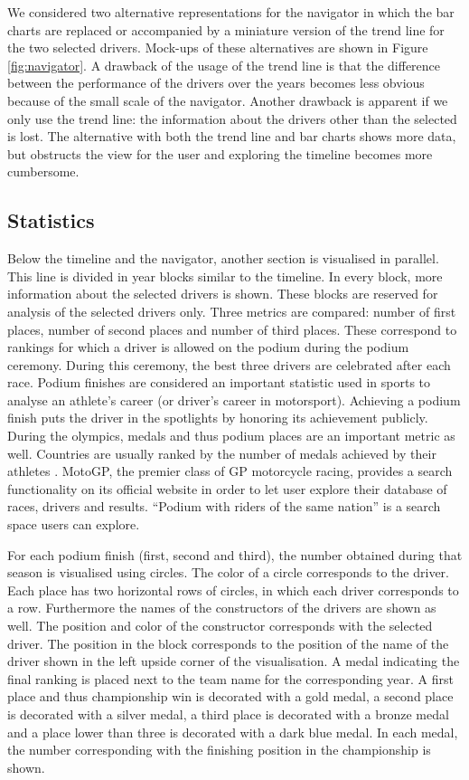 \documentclass{sigchi}
\begin{document}
We considered two alternative representations for the navigator in which the bar charts are replaced or accompanied by a miniature version of the trend line for the two selected drivers. Mock-ups of these alternatives are shown in Figure \ref{fig:navigator}. A drawback of the usage of the trend line is that the difference between the performance of the drivers over the years becomes less obvious because of the small scale of the navigator. Another drawback is apparent if we only use the trend line: the information about the drivers other than the selected is lost.
The alternative with both the trend line and bar charts shows more data, but obstructs the view for the user and exploring the timeline becomes more cumbersome.


\subsection{Statistics}

\label{statistics}
Below the timeline and the navigator, another section is visualised in parallel. This line is divided in year blocks similar to the timeline. In every block, more information about the selected  drivers is shown. These blocks are reserved for analysis of the selected drivers only. Three metrics are compared: number of first places, number of second places and number of third places. These correspond to rankings for which a driver is allowed on the podium during the podium ceremony. During this ceremony, the best three drivers are celebrated after each race. Podium finishes are considered an important statistic used in sports to analyse an athlete's career (or driver's career in motorsport). Achieving a podium finish puts the driver in the spotlights by honoring its achievement publicly. During the olympics, medals and thus podium places are an important metric as well. Countries are usually ranked by the number of medals achieved by their athletes \cite{olympic}. MotoGP, the premier class of GP motorcycle racing\cite{motogp}, provides a search functionality on its official website in order to let user explore their database of races, drivers and results. ``Podium with riders of the same nation'' is a search space users can explore.

For each podium finish (first, second and third), the number obtained during that season is visualised using circles. The color of a circle corresponds to the driver. Each place has two horizontal rows of circles, in which each driver corresponds to a row. Furthermore the names of the constructors of the drivers are shown as well. The position and color of the constructor corresponds with the selected driver. The position in the block corresponds to the position of the name of the driver shown in the left upside corner of the visualisation. A medal indicating the final ranking is placed next to the team name for the corresponding year. A first place and thus championship win is decorated with a gold medal, a second place is decorated with a silver medal, a third place is decorated with a bronze medal and a place lower than three is decorated with a dark blue medal. In each medal, the number corresponding with the finishing position in the championship is shown.
\end{document}
